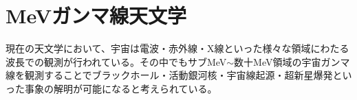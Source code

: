\chapter{MeVガンマ線天文学}
現在の天文学において、宇宙は電波・赤外線・X線といった様々な領域にわたる波長での観測が行われている。その中でもサブMeV$\sim$数十MeV領域の宇宙ガンマ線を観測することでブラックホール・活動銀河核・宇宙線起源・超新星爆発といった事象の解明が可能になると考えられている。

